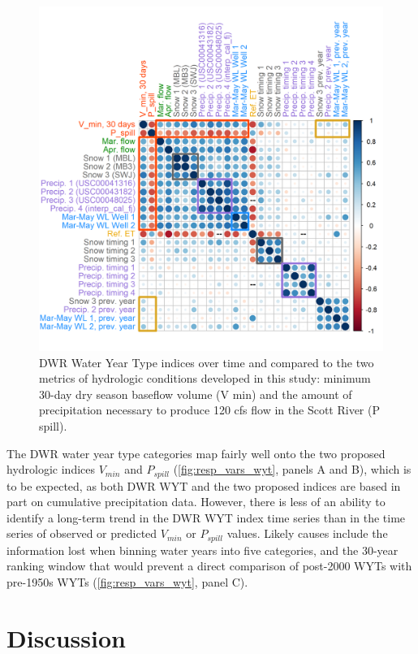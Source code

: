 \documentclass[hess, manuscript]{copernicus}
\begin{document}
\begin{figure}
\includegraphics[width=1\linewidth]{f08} \caption{\label{fig:resp_vars_wyt} DWR Water Year Type indices over time and compared to the two metrics of hydrologic conditions developed in this study: minimum 30-day dry season baseflow volume (V min) and the amount of precipitation necessary to produce 120 cfs flow in the Scott River (P spill).}\label{fig:resp_vars_wyt}
\end{figure}

The DWR water year type categories map fairly well onto the two proposed
hydrologic indices \(V_{min}\) and \(P_{spill}\)
(\autoref{fig:resp_vars_wyt}, panels A and B), which is to be expected,
as both DWR WYT and the two proposed indices are based in part on
cumulative precipitation data. However, there is less of an ability to
identify a long-term trend in the DWR WYT index time series than in the
time series of observed or predicted \(V_{min}\) or \(P_{spill}\)
values. Likely causes include the information lost when binning water
years into five categories, and the 30-year ranking window that would
prevent a direct comparison of post-2000 WYTs with pre-1950s WYTs
(\autoref{fig:resp_vars_wyt}, panel C).

\section{Discussion}
\end{document}
